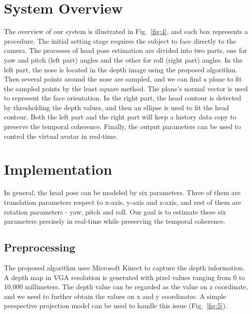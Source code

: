 \section{System Overview}
\label{sec:SysOverview}
The overview of our system is illustrated in Fig.~\ref{fig:4}, and each box represents a procedure. The initial setting stage requires the subject to face directly to the camera. The processes of head pose estimation are divided into two parts, one for yaw and pitch (left part) angles and the other for roll (right part) angles. In the left part, the nose is located in the depth image using the proposed algorithm. Then several points around the nose are sampled, and we can find a plane to fit the sampled points by the least square method. The plane’s normal vector is used to represent the face orientation. In the right part, the head contour is detected by thresholding the depth values, and then an ellipse is used to fit the head contour. Both the left part and the right part will keep a history data copy to preserve the temporal coherence. Finally, the output parameters can be used to control the virtual avatar in real-time.


\section{Implementation}
\label{sec:Implement}
In general, the head pose can be modeled by six parameters. Three of them are translation parameters respect to x-axis, y-axis and z-axis, and rest of them are rotation parameters - yaw, pitch and roll. Our goal is to estimate these six parameters precisely in real-time while preserving the temporal coherence.

\subsection{Preprocessing}
\label{subsec:Preprocessing}
The proposed algorithm uses Microsoft Kinect to capture the depth information. A depth map in VGA resolution is generated with pixel values ranging from 0 to 10,000 millimeters. The depth value can be regarded as the value on z coordinate, and we need to further obtain the values on x and y coordinates. A simple perspective projection model can be used to handle this issue (Fig.~\ref{fig:5}).

